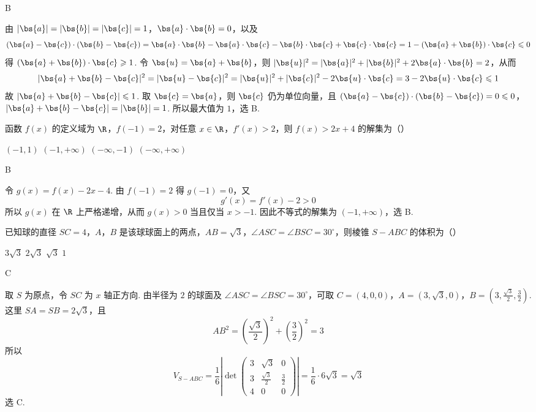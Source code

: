 \begin{answer}
B
\end{answer}

\begin{solution}
由 \(|\bs{a}|=|\bs{b}|=|\bs{c}|=1\)，\(\bs{a}\cdot\bs{b}=0\)，以及
\[
(\bs{a}-\bs{c})\cdot(\bs{b}-\bs{c})=\bs{a}\cdot\bs{b}-\bs{a}\cdot\bs{c}-\bs{b}\cdot\bs{c}+\bs{c}\cdot\bs{c}
=1-(\bs{a}+\bs{b})\cdot\bs{c}\leqslant0
\]
得 \((\bs{a}+\bs{b})\cdot\bs{c}\geqslant1\). 令 \(\bs{u}=\bs{a}+\bs{b}\)，则
\(|\bs{u}|^2=|\bs{a}|^2+|\bs{b}|^2+2\bs{a}\cdot\bs{b}=2\)，从而
\[
|\bs{a}+\bs{b}-\bs{c}|^2=|\bs{u}-\bs{c}|^2=|\bs{u}|^2+|\bs{c}|^2-2\bs{u}\cdot\bs{c}=3-2\bs{u}\cdot\bs{c}\leqslant1
\]
故 \(|\bs{a}+\bs{b}-\bs{c}|\leqslant1\). 取 \(\bs{c}=\bs{a}\)，则 \(\bs{c}\) 仍为单位向量，且 \((\bs{a}-\bs{c})\cdot(\bs{b}-\bs{c})=0\leqslant0\)，\(|\bs{a}+\bs{b}-\bs{c}|=|\bs{b}|=1\). 所以最大值为 \(1\)，选 B.
\end{solution}

\begin{problem}
函数 \( f(x) \) 的定义域为 \( \R \)，\( f(-1) = 2 \)，对任意 \( x \in \R \)，\( f'(x) > 2 \)，则 \( f(x) > 2x + 4 \) 的解集为（\quad）

\choices
    {\((-1,1)\)}
    {\((-1,+\infty)\)}
    {\((-\infty,-1)\)}
    {\((-\infty, +\infty)\)}
\end{problem}

\begin{answer}
B
\end{answer}

\begin{solution}
令 \(g(x)=f(x)-2x-4\). 由 \(f(-1)=2\) 得 \(g(-1)=0\)，又
\[
g'(x)=f'(x)-2>0
\]
所以 \(g(x)\) 在 \(\R\) 上严格递增，从而 \(g(x)>0\) 当且仅当 \(x>-1\). 因此不等式的解集为 \((-1,+\infty)\)，选 B.
\end{solution}

\begin{problem}
已知球的直径 \(SC = 4\)，\(A\)，\(B\) 是该球球面上的两点，\(AB = \sqrt{3}\)，\(\angle ASC = \angle BSC = 30^\circ\)，则棱锥 \(S - ABC\) 的体积为（\quad）

\choices
    {\(3\sqrt{3}\)}
    {\(2\sqrt{3}\)}
    {\(\sqrt{3}\)}
    {\(1\)}
\end{problem}

\begin{answer}
C
\end{answer}

\begin{solution}
取 \(S\) 为原点，令 \(SC\) 为 \(x\) 轴正方向. 由半径为 \(2\) 的球面及 \(\angle ASC=\angle BSC=30^\circ\)，可取 \(C=(4,0,0)\)，\(A=(3,\sqrt3,0)\)，\(B=\left(3,\frac{\sqrt3}{2},\frac32\right)\).
这里 \(SA=SB=2\sqrt3\)，且
\[
AB^2=\left(\frac{\sqrt3}{2}\right)^2+\left(\frac32\right)^2=3
\]
所以
\[
V_{S-ABC}=\frac16\left|\det\begin{pmatrix}3&\sqrt3&0\\3&\frac{\sqrt3}{2}&\frac32\\4&0&0\end{pmatrix}\right|=\frac16\cdot6\sqrt3=\sqrt3
\]
选 C.
\end{solution}


